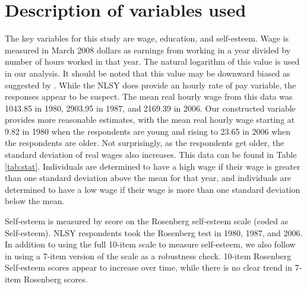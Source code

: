 \documentclass[12pt]{report}
\newcommand{\citee}[1]{\citename{#1} \citeyear{#1}}
\begin{document}
\begin{comment} This section will provide a basic overview of the NLSY79 \end{comment}

\section*{Description of variables used}


\begin{comment} This section will discuss which variables from the NLSY will be used and provide a description of them \end{comment}

The key variables for this study are wage, education, and self-esteem. Wage is measured in March 2008 dollars as earnings from working in a year divided by number of hours worked in that year. The natural logarithm of this value is used in our analysis. It should be noted that this value may be downward biased as suggested by \citee{B1980}. While the NLSY does provide an hourly rate of pay variable, the responses appear to be suspect. The mean real hourly wage from this data was 1043.85 in 1980, 2903.95 in 1987, and 2169.39 in 2006. Our constructed variable provides more reasonable estimates, with the mean real hourly wage starting at 9.82 in 1980 when the respondents are young and rising to 23.65 in 2006 when the respondents are older. Not surprisingly, as the respondents get older, the standard deviation of real wages also increases. This data can be found in Table \ref{tab:stat}. Individuals are determined to have a high wage if their wage is greater than one standard deviation above the mean for that year, and individuals are determined to have a low wage if their wage is more than one standard deviation below the mean.

Self-esteem is measured by score on the Rosenberg self-esteem scale (coded as Self-esteem).  NLSY respondents took the Rosenberg test in 1980, 1987, and 2006. In addition to using the full 10-item scale to measure self-esteem, we also follow \citee{M2001} in using a 7-item version of the scale as a robustness check. 10-item Rosenberg Self-esteem scores appear to increase over time, while there is no clear trend in 7-item Rosenberg scores.
\end{document}
